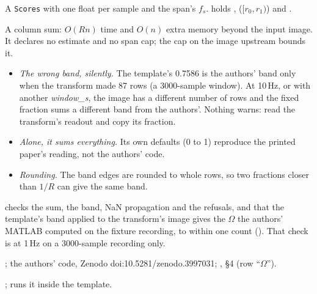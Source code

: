 A \texttt{Scores} with one float per sample and the span's $f_s$.  holds
,  ($[r_0, r_1)$) and .

A column sum: $O(Rn)$ time and $O(n)$ extra memory beyond the input image. It declares no
estimate and no span cap; the cap on the image upstream bounds it.

\begin{itemize}
\item \emph{The wrong band, silently.} The template's 0.7586 is the authors' band only when
  the transform made 87 rows (a 3000-sample window). At 10\,Hz, or with another
  \emph{window\_s}, the image has a different number of rows and the fixed fraction sums a
  different band from the authors'. Nothing warns: read the transform's readout and copy its
  fraction.
\item \emph{Alone, it sums everything.} Its own defaults (0 to 1) reproduce the printed paper's
  reading, not the authors' code.
\item \emph{Rounding.} The band edges are rounded to whole rows, so two fractions closer than
  $1/R$ can give the same band.
\end{itemize}

 checks the sum, the band, NaN propagation and
the refusals, and that the template's band applied to the transform's image gives the
$\Omega$ the authors' MATLAB computed on the fixture recording, to within one count
(). That check is at 1\,Hz on a
3000-sample recording only.

\citet{dehshibi2021electrical}; the authors' code, Zenodo doi:10.5281/zenodo.3997031;
, \S4 (row ``$\Omega$'').

;  runs it
inside the template.
